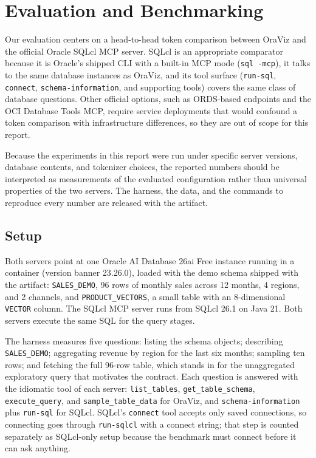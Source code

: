 \section{Evaluation and Benchmarking}\label{sec:evaluation}

Our evaluation centers on a head-to-head token comparison between OraViz and the official Oracle SQLcl MCP server. SQLcl is an appropriate comparator because it is Oracle's shipped CLI with a built-in MCP mode (\texttt{sql -mcp}), it talks to the same database instances as OraViz, and its tool surface (\texttt{run-sql}, \texttt{connect}, \texttt{schema-information}, and supporting tools) covers the same class of database questions. Other official options, such as ORDS-based endpoints and the OCI Database Tools MCP, require service deployments that would confound a token comparison with infrastructure differences, so they are out of scope for this report.

Because the experiments in this report were run under specific server versions, database contents, and tokenizer choices, the reported numbers should be interpreted as measurements of the evaluated configuration rather than universal properties of the two servers. The harness, the data, and the commands to reproduce every number are released with the artifact.

\subsection{Setup}

Both servers point at one Oracle AI Database 26ai Free instance running in a container (version banner 23.26.0), loaded with the demo schema shipped with the artifact: \texttt{SALES\_DEMO}, 96 rows of monthly sales across 12 months, 4 regions, and 2 channels, and \texttt{PRODUCT\_VECTORS}, a small table with an 8-dimensional \texttt{VECTOR} column. The SQLcl MCP server runs from SQLcl 26.1 on Java 21. Both servers execute the same SQL for the query stages.

The harness measures five questions: listing the schema objects; describing \texttt{SALES\_DEMO}; aggregating revenue by region for the last six months; sampling ten rows; and fetching the full 96-row table, which stands in for the unaggregated exploratory query that motivates the contract. Each question is answered with the idiomatic tool of each server: \texttt{list\_tables}, \texttt{get\_table\_schema}, \texttt{execute\_query}, and \texttt{sample\_table\_data} for OraViz, and \texttt{schema-information} plus \texttt{run-sql} for SQLcl. SQLcl's \texttt{connect} tool accepts only saved connections, so connecting goes through \texttt{run-sqlcl} with a connect string; that step is counted separately as SQLcl-only setup because the benchmark must connect before it can ask anything.

